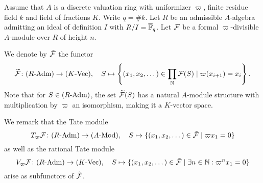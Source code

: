 \documentclass[../main.tex]{subfiles}
\begin{document}
Assume that $A$ is a discrete valuation ring with uniformizer
$\varpi$, finite residue field $k$ and field of fractions $K$. 
Write $q = \# k$. Let $R$ be an admissible $A$-algebra admitting an ideal of definition
$I$ with $R/I = {\overline {\mathbb{F}}_q}$. Let $\mathcal{F}$ be a formal
$\varpi$-divisible $A$-module over $R$ of height $n$. 
\begin{defi}
  We denote by $\tilde {\mathcal{F}}$ the functor
  \begin{equation*}
    \widetilde{\mathcal{F}} \colon {({R}\text-\allowbreak\mathrm{Adm})} \to {({K}\text-\allowbreak\mathrm{Vec})}, \quad
    S \mapsto \left\{(x_1, x_2, \dots) \in \prod_{\mathbb{N}} \mathcal{F}(S) \mid \varpi (x_{i+1}) =
    x_i \right\}.
  \end{equation*}
  Note that for $S \in {({R}\text-\allowbreak\mathrm{Adm})}$, the set $\widetilde{\mathcal{F}}(S)$ has a natural
  $A$-module structure with multiplication by $\varpi$ an isomorphism, making
  it a $K$-vector space.
\end{defi}

We remark that the Tate module
\begin{equation}\label{eq:TateModuleDef}
  T_\varpi \mathcal{F} \colon {({R}\text-\allowbreak\mathrm{Adm})} \to {({A}\text-\allowbreak\mathrm{Mod})}, \quad S \mapsto \{(x_1, x_2, \dots)
  \in \tilde {\mathcal{F}} \mid \varpi x_1 = 0\}
\end{equation}
as well as the rational Tate module 
\begin{equation}\label{eq:RationalTateModuleDef}
  V_\varpi \mathcal{F} \colon {({R}\text-\allowbreak\mathrm{Adm})} \to {({K}\text-\allowbreak\mathrm{Vec})}, \quad S \mapsto \{(x_1, x_2, \dots)
  \in \tilde {\mathcal{F}} \mid \exists n \in \mathbb{N} : \varpi^n x_1 = 0\}
\end{equation}
arise as subfunctors of $\widetilde{\mathcal{F}}$. 
\end{document}
